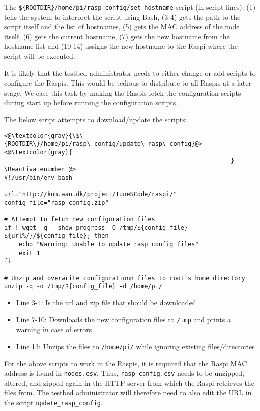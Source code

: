 The \texttt{\$\{ROOTDIR\}/home/pi/rasp\_config/set\_hostname} script (in
script lines): (1) tells the system to interpret the script using \ac{Bash},
(3-4) gets the path to the script itself and the list of hostnames, (5) gets
the \ac{MAC} address of the node itself, (6) gets the current hostname, (7)
gets the new hostname from the hostname list and (10-14) assigns the new
hostname to the \ac{Raspi} where the script will be executed.

It is likely that the testbed administrator needs to either change or add
scripts to configure the \ac{Raspi}s. This would be tedious to distribute to
all \ac{Raspi}s at a later stage. We ease this task by making the \ac{Raspi}s fetch the
configuration scripts during start up before running the configuration scripts.

The below script attempts to download/update the scripts:

\Suppressnumber\begin{lstlisting}[]
<@\textcolor{gray}{\$\{ROOTDIR\}/home/pi/rasp\_config/update\_rasp\_config}@>
<@\textcolor{gray}{
---------------------------------------------------------------}
\Reactivatenumber @>
#!/usr/bin/env bash

url="http://kom.aau.dk/project/TuneSCode/raspi/"
config_file="rasp_config.zip"

# Attempt to fetch new configuration files
if ! wget -q --show-progress -O /tmp/${config_file} ${url%/}/${config_file}; then
    echo "Warning: Unable to update rasp_config files"
    exit 1
fi

# Unzip and overwrite configurationn files to root's home directory
unzip -q -o /tmp/${config_file} -d /home/pi/
\end{lstlisting}
\FloatBarrier
\vspace{-5mm}

\begin{itemize}
    \item Line 3-4: Is the url and zip file that should be downloaded
    \item Line 7-10: Downloads the new configuration files to \texttt{/tmp}
        and prints a warning in case of errors
    \item Line 13: Unzips the files to \texttt{/home/pi/} while ignoring existing files/directories
\end{itemize}



For the above scripts to work in the \ac{Raspi}s, it is required that the \ac{Raspi}
\ac{MAC} address is found in \texttt{nodes.csv}. Thus,
\texttt{rasp\_config.csv} needs to be unzipped, altered, and zipped again in
the \ac{HTTP} server from which the \ac{Raspi} retrieves the files from.
The testbed administrator will therefore need to also edit the \ac{URL} in the
script \texttt{update\_rasp\_config}.

